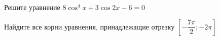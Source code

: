 \begin{ex}
	\begin{condition}
		\begin{enumcols}[label=\asbuk*)]
			\item Решите уравнение \( 8\cos^4 x + 3\cos 2x - 6 = 0 \)
			\item Найдите все корни уравнения, принадлежащие отрезку \( \left[-\dfrac{7\pi}{2};-2\pi\right]  \)
		\end{enumcols}
	\end{condition}
\end{ex}
